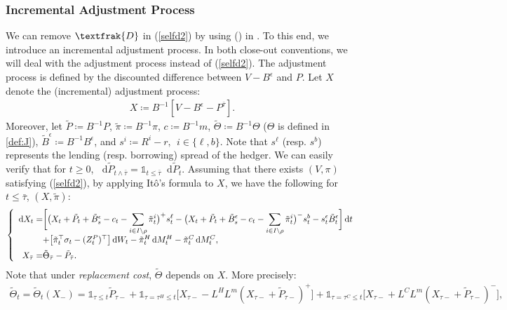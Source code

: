 \documentclass[a4paper, 11pt]{article}              %
\numberwithin{equation}{section}
\theoremstyle{plain}
\newcommand{\btau}{\bar{\tau}}
\newcommand{\1}{\mathds{1}}
\newcommand{\frD}{\textfrak{D}}
\newcommand{\Bt}{\tilde{B}}
\newcommand{\pt}{\tilde{P}}
\newcommand{\pit}{\tilde{\pi}}
\newcommand{\Jt}{\tilde{\Theta}}
\newcommand{\SUM}{\displaystyle\sum}
\theoremstyle{plain}
\theoremstyle{definition}
\theoremstyle{plain}
\newcommand*\df{\mathop{}\!\mathrm{d}}
\newcommand{\rom}[1]{\lowercase\expandafter{\romannumeral #1\relax}}
\begin{document}
\subsubsection{Incremental Adjustment Process}
\label{sec:xva}
We can remove $\frD$ in (\ref{selfd2}) by using (\rom{3}) in . To
this end, we introduce an incremental adjustment process. In both close-out
conventions, we will deal with the adjustment process instead of (\ref{selfd2}).
The adjustment process is defined by the discounted difference between
$V-B^\epsilon$ and $P$. Let $X$ denote the (incremental) adjustment process:
\begin{align}
X \coloneqq B^{-1}[V-B^\epsilon -P^{\btau}]. \nonumber
\end{align}
Moreover, let $\pt \coloneqq B^{-1}P$, $\pit \coloneqq B^{-1}\pi$,
$c \coloneqq B^{-1}m$, $\Jt \coloneqq B^{-1}\Theta$ ($\Theta$ is defined in \cref{def:J}),
$\Bt^\epsilon\coloneqq B^{-1}B^\epsilon$, and
$s^i \coloneqq R^i - r, ~~i \in \{\ell, b\}$.  Note that $s^\ell$ (resp. $s^b$)
represents the lending (resp. borrowing) spread of the hedger. We can easily
verify that for $t \geq0$,
$\df \pt_{t\wedge \btau} = \1_{t \leq \btau}\df \pt_t$.  Assuming that there exists
$(V, \pi)$ satisfying (\ref{selfd2}), by applying It\^o's formula to $X$, we have
the following for $t \leq \btau$, $(X, \pit)$:
\begin{align}      \label{dyn-xva}
  \left\lbrace
  \begin{array}{r@{}l}
    \df X_t
  =& \bigg[\big(X_t + \pt_t +\Bt^\epsilon_s- c_t 
- \SUM_{i \in I \setminus \rho} \tilde{\pi}^i_t\big)^{+}s^{\ell}_t
     -\big(X_t + \pt_t +\Bt^\epsilon_s- c_t - \SUM_{i \in I \setminus \rho}\tilde{\pi}^i_t\big)^{-}s^{b}_t
     -s^\epsilon_t\Bt^\epsilon_t\bigg]\df t      \\ \vspace{0.2cm}
   &+\big[\tilde{\pi}^{\top}_t\sigma_t-(Z^P_t)^{\top}\big]\df W_t 
     - \tilde{\pi}^H_{t}\df M^H_t- \tilde{\pi}^C_{t}\df M^C_t, \\
 X_{\btau} =& \Jt_{\btau} - \pt_{\btau}.
  \end{array}
  \right.
\end{align}
 Note that under \textit{replacement cost}, $\Jt$ depends on $X$. More
 precisely: 
\begin{align}
\Jt_t = \Jt_t(X_-) =  \1_{\tau \leq t} \pt_{\tau-}+\1_{\tau=\tau^H\leq t}\big[X_{\tau-}-L^HL^m(X_{\tau-} +
  \pt_{\tau-} )^+\big] +\1_{\tau=\tau^C \leq t}\big[X_{\tau-}+L^CL^m(X_{\tau-} + \pt_{\tau-})^-
     \big],\nonumber 
\end{align}
\end{document}
